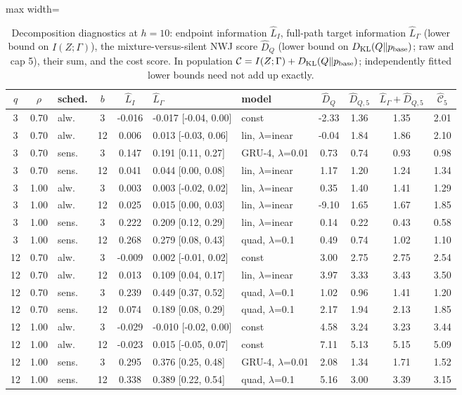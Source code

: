 \begin{table}[htbp]
\centering
\scriptsize
\caption{Decomposition diagnostics at $h=10$: endpoint information $\widehat L_I$, full-path target information $\widehat L_\Gamma$ (lower bound on $I(Z;\Gamma)$), the mixture-versus-silent NWJ score $\widehat D_Q$ (lower bound on $D_{\rm KL}(Q\Vert p_{\rm base})$; raw and cap 5), their sum, and the cost score. In population $\mathcal C = I(Z;\Gamma)+D_{\rm KL}(Q\Vert p_{\rm base})$; independently fitted lower bounds need not add up exactly.}\label{tab:decomposition}
\begin{adjustbox}{max width=\textwidth}
\begin{tabular}{cclc c l l cc cc}
\toprule
$q$ & $\rho$ & sched. & $b$ & $\widehat L_I$ & $\widehat L_{\Gamma}$ & model & $\widehat D_Q$ & $\widehat D_{Q,5}$ & $\widehat L_\Gamma+\widehat D_{Q,5}$ & $\widehat{\mathcal C}_5$ \\
\midrule
3 & 0.70 & alw. & 3 & -0.016 & -0.017 [-0.04, 0.00] & const & -2.33 & 1.36 & 1.35 & 2.01 \\
3 & 0.70 & alw. & 12 & 0.006 & 0.013 [-0.03, 0.06] & lin, $\lambda$=inear & -0.04 & 1.84 & 1.86 & 2.10 \\
3 & 0.70 & sens. & 3 & 0.147 & 0.191 [0.11, 0.27] & GRU-4, $\lambda$=0.01 & 0.73 & 0.74 & 0.93 & 0.98 \\
3 & 0.70 & sens. & 12 & 0.041 & 0.044 [0.00, 0.08] & lin, $\lambda$=inear & 1.17 & 1.20 & 1.24 & 1.34 \\
3 & 1.00 & alw. & 3 & 0.003 & 0.003 [-0.02, 0.02] & lin, $\lambda$=inear & 0.35 & 1.40 & 1.41 & 1.29 \\
3 & 1.00 & alw. & 12 & 0.025 & 0.015 [0.00, 0.03] & lin, $\lambda$=inear & -9.10 & 1.65 & 1.67 & 1.85 \\
3 & 1.00 & sens. & 3 & 0.222 & 0.209 [0.12, 0.29] & lin, $\lambda$=inear & 0.14 & 0.22 & 0.43 & 0.58 \\
3 & 1.00 & sens. & 12 & 0.268 & 0.279 [0.08, 0.43] & quad, $\lambda$=0.1 & 0.49 & 0.74 & 1.02 & 1.10 \\
12 & 0.70 & alw. & 3 & -0.009 & 0.002 [-0.01, 0.02] & const & 3.00 & 2.75 & 2.75 & 2.54 \\
12 & 0.70 & alw. & 12 & 0.013 & 0.109 [0.04, 0.17] & lin, $\lambda$=inear & 3.97 & 3.33 & 3.43 & 3.50 \\
12 & 0.70 & sens. & 3 & 0.239 & 0.449 [0.37, 0.52] & quad, $\lambda$=0.1 & 1.02 & 0.96 & 1.41 & 1.20 \\
12 & 0.70 & sens. & 12 & 0.074 & 0.189 [0.08, 0.29] & quad, $\lambda$=0.1 & 2.17 & 1.94 & 2.13 & 1.85 \\
12 & 1.00 & alw. & 3 & -0.029 & -0.010 [-0.02, 0.00] & const & 4.58 & 3.24 & 3.23 & 3.44 \\
12 & 1.00 & alw. & 12 & -0.023 & 0.015 [-0.05, 0.07] & const & 7.11 & 5.13 & 5.15 & 5.09 \\
12 & 1.00 & sens. & 3 & 0.295 & 0.376 [0.25, 0.48] & GRU-4, $\lambda$=0.01 & 2.08 & 1.34 & 1.71 & 1.52 \\
12 & 1.00 & sens. & 12 & 0.338 & 0.389 [0.22, 0.54] & quad, $\lambda$=0.1 & 5.16 & 3.00 & 3.39 & 3.15 \\
\bottomrule
\end{tabular}
\end{adjustbox}
\end{table}
